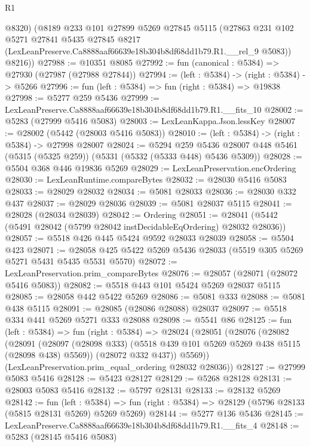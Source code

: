 \begin{lexlean}{R1}
\begin{coremodule}
        @8320)
      (@8189
        @233
        @101
        @27899
        @5269
        @27845
        @5115
        (@27863
          @231
          @102
          @5271
          @27841
          @5435
          @27845
          @8217
          (LexLeanPreserve.Ca8888aaf66639e18b304b8df68dd1b79.R1.__rel_9 @5083))
        @8216))
@27988 := @10351 @8085
@27992 := fun (canonical : @5384) => @27930 (@27987 (@27988 @27844))
@27994 := (left : @5384) -> (right : @5384) -> @5266
@27996 := fun (left : @5384) => fun (right : @5384) => @19838
@27998 := @5277 @259 @5436
@27999 := LexLeanPreserve.Ca8888aaf66639e18b304b8df68dd1b79.R1.__fits_10
@28002 := @5283 (@27999 @5416 @5083)
@28003 := LexLeanKappa.Json.lessKey
@28007 := @28002 (@5442 (@28003 @5416 @5083))
@28010 := (left : @5384) -> (right : @5384) -> @27998 @28007
@28024 := @5294
    @259
    @5436
    @28007
    @448
    @5461
    (@5315 (@5325 @259))
    (@5331 (@5332 (@5333 @448) @5436 @5309))
@28028 := @5504 @368 @446 @19836 @5269
@28029 := LexLeanPreservation.encOrdering
@28030 := LexLeanRuntime.compareBytes
@28032 := @28030 @5416 @5083
@28033 := @28029 @28032
@28034 := @5081 @28033
@28036 := @28030 @332 @437
@28037 := @28029 @28036
@28039 := @5081 @28037 @5115
@28041 := @28028 (@28034 @28039)
@28042 := Ordering
@28051 := @28041 (@5442 (@5491 @28042 (@5799 @28042 instDecidableEqOrdering) @28032 @28036))
@28057 := @5518 @426 @445 @5424 @9592 @28033 @28039
@28058 := @5504 @423
@28071 := @28058 @425 @5422 @5269 @5436 @28033 (@5519 @305 @5269 @5271 @5431 @5435 @5531 @5570)
@28072 := LexLeanPreservation.prim_compareBytes
@28076 := @28057 (@28071 (@28072 @5416 @5083))
@28082 := @5518 @443 @101 @5424 @5269 @28037 @5115
@28085 := @28058 @442 @5422 @5269
@28086 := @5081 @333
@28088 := @5081 @438 @5115
@28091 := @28085 (@28086 @28088) @28037
@28097 := @5518 @334 @441 @5269 @5271 @333 @28088
@28098 := @5541 @86
@28125 := fun (left : @5384) =>
  fun (right : @5384) =>
  @28024
    (@28051
      (@28076
        (@28082
          (@28091
            (@28097 (@28098 @333) (@5518 @439 @101 @5269 @5269 @438 @5115 (@28098 @438) @5569))
            (@28072 @332 @437))
          @5569))
      (LexLeanPreservation.prim_equal_ordering @28032 @28036))
@28127 := @27999 @5083 @5416
@28128 := @5423 @28127
@28129 := @5268 @28128
@28131 := @28003 @5083 @5416
@28132 := @5797 @28131
@28133 := @28132 @5269
@28142 := fun (left : @5384) =>
  fun (right : @5384) => @28129 (@5796 @28133 (@5815 @28131 @5269) @5269 @5269)
@28144 := @5277 @136 @5436
@28145 := LexLeanPreserve.Ca8888aaf66639e18b304b8df68dd1b79.R1.__fits_4
@28148 := @5283 (@28145 @5416 @5083)

\end{coremodule}
\end{lexlean}
